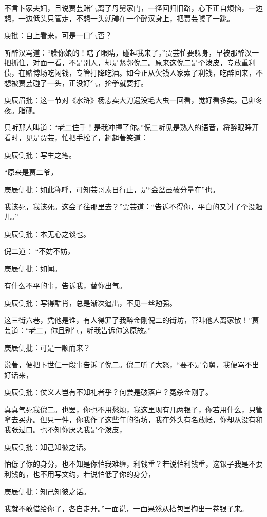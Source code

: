 \begin{parag}
    不言卜家夫妇，且说贾芸赌气离了母舅家门，一径回归旧路，心下正自烦恼，一边想，一边低头只管走，不想一头就碰在一个醉汉身上，把贾芸唬了一跳。\begin{note}庚批：自上看来，可是一口气否？\end{note}听醉汉骂道：“臊你娘的！瞎了眼睛，碰起我来了。”贾芸忙要躲身，早被那醉汉一把抓住，对面一看，不是别人，却是紧邻倪二。原来这倪二是个泼皮，专放重利债，在赌博场吃闲钱，专管打降吃酒。如今正从欠钱人家索了利钱，吃醉回来，不想被贾芸碰了一头，正没好气，抡拳就要打。\begin{note}庚辰眉批：这一节对《水浒》杨志卖大刀遇没毛大虫一回看，觉好看多矣。己卯冬夜。脂砚。\end{note}只听那人叫道：“老二住手！是我冲撞了你。”倪二听见是熟人的语音，将醉眼睁开看时，见是贾芸，忙把手松了，趔趄著笑道：\begin{note}庚辰侧批：写生之笔。\end{note}“原来是贾二爷，\begin{note}庚辰侧批：如此称呼，可知芸哥素日行止，是“金盆虽破分量在”也。\end{note}我该死，我该死。这会子往那里去？”贾芸道：“告诉不得你，平白的又讨了个没趣儿。”\begin{note}庚辰侧批：本无心之谈也。\end{note}倪二道： “不妨不妨，\begin{note}庚辰侧批：如闻。\end{note}有什么不平的事，告诉我，替你出气。\begin{note}庚辰侧批：写得酷肖，总是渐次逼出，不见一丝勉强。\end{note}这三街六巷，凭他是谁，有人得罪了我醉金刚倪二的街坊，管叫他人离家散！”贾芸道：“老二，你且别气，听我告诉你这原故。”\begin{note}庚辰侧批：可是一顺而来？\end{note}说著，便把卜世仁一段事告诉了倪二。倪二听了大怒，“要不是令舅，我便骂不出好话来，\begin{note}庚辰侧批：仗义人岂有不知礼者乎？何尝是破落户？冤杀金刚了。\end{note}真真气死我倪二。也罢，你也不用愁烦，我这里现有几两银子，你若用什么，只管拿去买办。但只一件，你我作了这些年的街坊，我在外头有名放帐，你却从没有和我张过口。也不知你厌恶我是个泼皮，\begin{note}庚辰侧批：知己知彼之话。\end{note}怕低了你的身分，也不知是你怕我难缠，利钱重？若说怕利钱重，这银子我是不要利钱的，也不用写文约，若说怕低了你的身分，\begin{note}庚辰侧批：知己知彼之话。\end{note}我就不敢借给你了，各自走开。”一面说，一面果然从搭包里掏出一卷银子来。
\end{parag}



